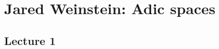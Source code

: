 \newpage
\section{Jared Weinstein: Adic spaces}
\subsection{Lecture 1}




















































